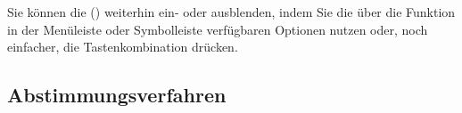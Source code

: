 Sie können die  () weiterhin ein- oder ausblenden, indem Sie die über die Funktion  in der Menüleiste oder Symbolleiste verfügbaren Optionen nutzen oder, noch einfacher, die Tastenkombination  drücken.


\subsection{Abstimmungsverfahren\label{reconciliation-account-howto}}

